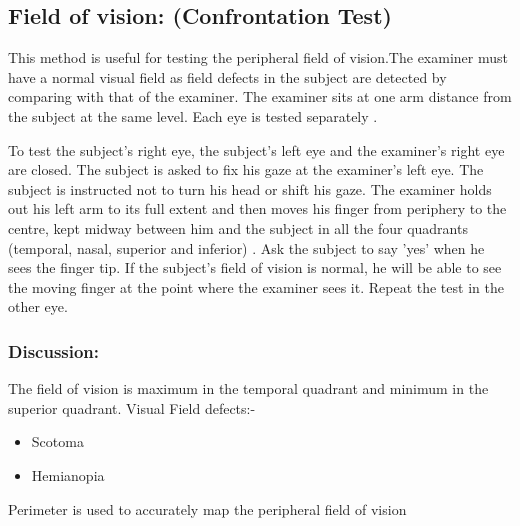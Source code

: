 \documentclass[a4paper,12pt,openany,twoside]{book}
\begin{document}
			\subsection*{Field of vision: (Confrontation Test)}
			This method is useful for testing the peripheral field of vision.The examiner must have a normal visual field as field defects in the subject are detected by comparing with that of the examiner. The examiner sits at one arm distance from the subject at the same level. Each eye is tested separately .
			\par
			To test the subject's right eye, the subject’s left eye and the examiner's right eye are closed. The subject is asked to fix his gaze at the examiner’s left eye. The subject is instructed not to turn his head or shift his gaze. The examiner holds out his left arm to its full extent and then moves his finger from periphery to the centre, kept midway between him and the subject in all the four quadrants (temporal, nasal, superior and inferior) . Ask the subject to say 'yes' when he sees the finger tip. If the subject's field of vision is normal, he will be able to see the moving finger at the point where the examiner sees it. Repeat the test in the other eye.
			\subsubsection*{Discussion:}
			The field of vision is maximum in the temporal quadrant and minimum in the superior quadrant.
			Visual Field defects:-
			\begin{itemize}
					\itemsep0em
					\item{Scotoma}
					\item{Hemianopia}
			\end{itemize}
			Perimeter is used to accurately map the peripheral field of vision
\end{document}
